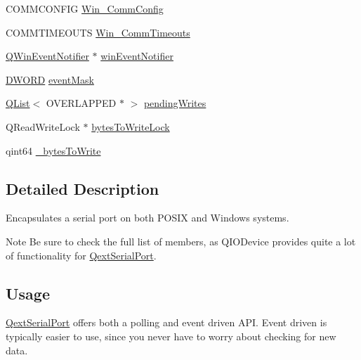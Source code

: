 \begin{DoxyCompactItemize}
\item 
C\-O\-M\-M\-C\-O\-N\-F\-I\-G \hyperlink{class_qext_serial_port_af1230bd3b947042b38303175d5f7c118}{Win\-\_\-\-Comm\-Config}
\item 
C\-O\-M\-M\-T\-I\-M\-E\-O\-U\-T\-S \hyperlink{class_qext_serial_port_ac4bc741baf6ceae86ab69e358e29c823}{Win\-\_\-\-Comm\-Timeouts}
\item 
\hyperlink{class_q_win_event_notifier}{Q\-Win\-Event\-Notifier} $\ast$ \hyperlink{class_qext_serial_port_aad5fe6450d0fab180df28d47e9eb6463}{win\-Event\-Notifier}
\item 
\hyperlink{gcs_2src_2experimental_2_power_log6_s_2main_8cpp_ad342ac907eb044443153a22f964bf0af}{D\-W\-O\-R\-D} \hyperlink{class_qext_serial_port_a41f809227f22fc1deb0532436b97b658}{event\-Mask}
\item 
\hyperlink{class_q_list}{Q\-List}$<$ O\-V\-E\-R\-L\-A\-P\-P\-E\-D $\ast$ $>$ \hyperlink{class_qext_serial_port_a49a6027bd1fe91c8df5b9f5cfa6c7ac2}{pending\-Writes}
\item 
Q\-Read\-Write\-Lock $\ast$ \hyperlink{class_qext_serial_port_a47de1fe5a7dcbac828fef5bc8a7aec65}{bytes\-To\-Write\-Lock}
\item 
qint64 \hyperlink{class_qext_serial_port_a62041e313b261b06ef9d6bf8c8775232}{\-\_\-bytes\-To\-Write}
\end{DoxyCompactItemize}


\subsection{Detailed Description}
Encapsulates a serial port on both P\-O\-S\-I\-X and Windows systems.

\begin{DoxyNote}{Note}
Be sure to check the full list of members, as Q\-I\-O\-Device provides quite a lot of functionality for \hyperlink{class_qext_serial_port}{Qext\-Serial\-Port}.
\end{DoxyNote}
\hypertarget{class_qxt_proxy_style_Usage}{}\subsection{Usage}\label{class_qxt_proxy_style_Usage}
\hyperlink{class_qext_serial_port}{Qext\-Serial\-Port} offers both a polling and event driven A\-P\-I. Event driven is typically easier to use, since you never have to worry about checking for new data.

